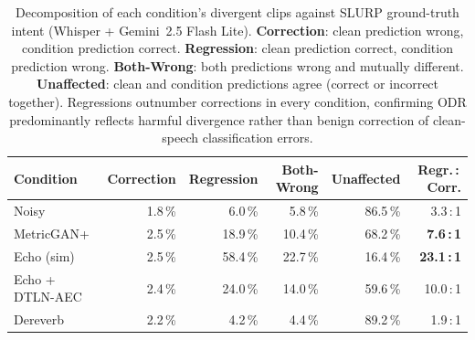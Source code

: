 \begin{table}[t]
  \centering
  \begin{tabular}{lrrrrr}
    \hline
    \textbf{Condition} & \textbf{Correction} & \textbf{Regression} &
    \textbf{Both-Wrong} & \textbf{Unaffected} & \textbf{Regr.\,:\,Corr.} \\
    \hline
    Noisy        & 1.8\,\% & 6.0\,\%  & 5.8\,\%  & 86.5\,\% & 3.3\,:\,1  \\
    MetricGAN+   & 2.5\,\% & 18.9\,\% & 10.4\,\% & 68.2\,\% & \textbf{7.6\,:\,1}  \\
    Echo (sim)   & 2.5\,\% & 58.4\,\% & 22.7\,\% & 16.4\,\% & \textbf{23.1\,:\,1} \\
    Echo + DTLN-AEC & 2.4\,\% & 24.0\,\% & 14.0\,\% & 59.6\,\% & 10.0\,:\,1 \\
    Dereverb     & 2.2\,\% & 4.2\,\%  & 4.4\,\%  & 89.2\,\% & 1.9\,:\,1  \\
    \hline
  \end{tabular}
  \caption{Decomposition of each condition's divergent clips against
    SLURP ground-truth intent (Whisper + Gemini~2.5 Flash Lite).
    \textbf{Correction}: clean prediction wrong, condition prediction
    correct. \textbf{Regression}: clean prediction correct, condition
    prediction wrong. \textbf{Both-Wrong}: both predictions wrong and
    mutually different. \textbf{Unaffected}: clean and condition
    predictions agree (correct or incorrect together). Regressions
    outnumber corrections in every condition, confirming ODR
    predominantly reflects harmful divergence rather than benign
    correction of clean-speech classification errors.}
  \label{tab:correction}
\end{table}

